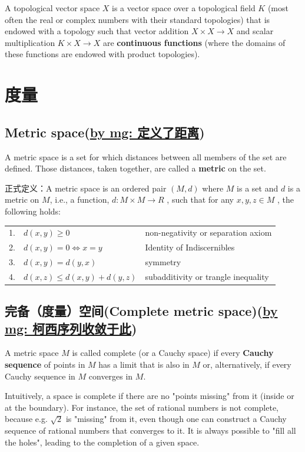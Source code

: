 A topological vector space $X$ is a vector space over a topological field $K$ (most often the real or complex numbers with their standard topologies) that is endowed with a topology such that vector addition $X \times X \rightarrow X$ and scalar multiplication $K \times X \rightarrow X$ are \textbf{continuous functions }(where the domains of these functions are endowed with product topologies).

\section{度量}
\subsection{Metric space(\underline{by mg: 定义了距离})}
\cite{_metric_????}

A metric space is a set for which distances between all members of the set are defined. Those distances, taken together, are called a \textbf{metric} on the set.\par
正式定义：A metric space is an ordered pair $(M,d)$ where $M$ is a set and $d$ is a metric on $M$, i.e., a function, $d: M \times M \rightarrow R$ , such that for any $x, y, z \in M$  , the following holds:\par
\begin{tabular}[l]{lll}
\hline
1. & $d(x,y) \geq 0$ & non-negativity or separation axiom \\ 
2. & $d(x,y)=0 \Leftrightarrow x=y$ & Identity of Indiscernibles \\ 
3. & $d(x,y)=d(y,x)$ & symmetry \\ 
4. & $d(x,z) \leq d(x,y) + d(y,z)$ & subadditivity or trangle inequality\\
\hline
\end{tabular}

\subsection{完备（度量）空间(Complete metric space)(\underline{by mg: 柯西序列收敛于此})}
\cite{_complete_????}
A metric space $M$ is called complete (or a Cauchy space) if every \textbf{Cauchy sequence }of points in $M$ has a limit that is also in $M$ or, alternatively, if every Cauchy sequence in $M$ converges in $M$.\par
Intuitively, a space is complete if there are no "points missing" from it (inside or at the boundary). For instance, the set of rational numbers is not complete, because e.g. $\sqrt 2$ is "missing" from it, even though one can construct a Cauchy sequence of rational numbers that converges to it. It is always possible to "fill all the holes", leading to the completion of a given space.


